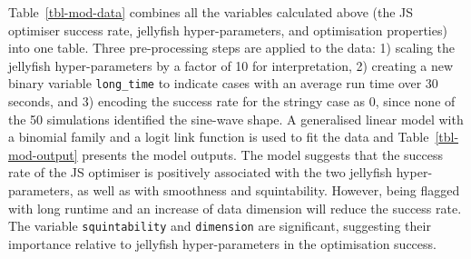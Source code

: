\documentclass[
  number,
  preprint,
  3p]{elsarticle}
\begin{document}
Table~\ref{tbl-mod-data} combines all the variables calculated above
(the JS optimiser success rate, jellyfish hyper-parameters, and
optimisation properties) into one table. Three pre-processing steps are
applied to the data: 1) scaling the jellyfish hyper-parameters by a
factor of 10 for interpretation, 2) creating a new binary variable
\texttt{long\_time} to indicate cases with an average run time over 30
seconds, and 3) encoding the success rate for the stringy case as 0,
since none of the 50 simulations identified the sine-wave shape. A
generalised linear model with a binomial family and a logit link
function is used to fit the data and Table~\ref{tbl-mod-output} presents
the model outputs. The model suggests that the success rate of the JS
optimiser is positively associated with the two jellyfish
hyper-parameters, as well as with smoothness and squintability. However,
being flagged with long runtime and an increase of data dimension will
reduce the success rate. The variable \texttt{squintability} and
\texttt{dimension} are significant, suggesting their importance relative
to jellyfish hyper-parameters in the optimisation success.

\begingroup\fontsize{7}{9}\selectfont
\end{document}
